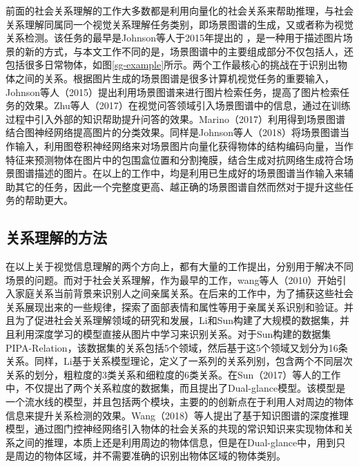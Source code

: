 前面的社会关系理解的工作大多数都是利用向量化的社会关系来帮助推理，与社会关系理解同属同一个视觉关系理解任务类别，即场景图谱的生成，又或者称为视觉关系检测。该任务的最早是Johnson等人于2015年提出的
\cite{johnson2015image}，是一种用于描述图片场景的新的方式，与本文工作不同的是，场景图谱中的主要组成部分不仅包括人，还包括很多日常物体，如图\ref{sg-example}所示。两个工作最核心的挑战在于识别出物体之间的关系。根据图片生成的场景图谱是很多计算机视觉任务的重要输入，Johnson等人（2015）\cite{johnson2015image}提出利用场景图谱来进行图片检索任务，提高了图片检索任务的效果。Zhu等人（2017）\cite{zhu2017knowledge}在视觉问答领域引入场景图谱中的信息，通过在训练过程中引入外部的知识帮助提升问答的效果。Marino（2017）\cite{marino2017the}利用得到场景图谱结合图神经网络提高图片的分类效果。同样是Johnson等人（2018）\cite{johnson2018image}将场景图谱当作输入，利用图卷积神经网络来对场景图片向量化获得物体的结构编码向量，当作特征来预测物体在图片中的包围盒位置和分割掩膜，结合生成对抗网络生成符合场景图谱描述的图片。在以上的工作中，均是利用已生成好的场景图谱当作输入来辅助其它的任务，因此一个完整度更高、越正确的场景图谱自然而然对于提升这些任务的帮助更大。

\subsection{关系理解的方法}
在以上关于视觉信息理解的两个方向上，都有大量的工作提出，分别用于解决不同场景的问题。而对于社会关系理解，作为最早的工作，wang等人（2010）开始引入家庭关系当前背景来识别人之间亲属关系。在后来的工作中\cite{dibeklioglu2013like,xia2012understanding,chen2012discovering}，为了捕获这些社会关系展现出来的一些规律，探索了面部表情和属性等用于亲属关系识别和验证。并且为了促进社会关系理解领域的研究和发展，Li\cite{li2017dual-glance}和Sun\cite{sun2017a}构建了大规模的数据集，并且利用深度学习的模型直接从图片中学习来识别关系。对于Sun构建的数据集PIPA-Relation，该数据集的关系包括5个领域，然后基于这5个领域又划分为16条关系。同样，Li基于关系模型理论，定义了一系列的关系列别，包含两个不同层次关系的划分，粗粒度的3类关系和细粒度的6类关系。在Sun（2017）等人的工作中，不仅提出了两个关系粒度的数据集，而且提出了Dual-glance模型。该模型是一个流水线的模型，并且包括两个模块，主要的的创新点在于利用人对周边的物体信息来提升关系检测的效果。Wang（2018）等人提出了基于知识图谱的深度推理模型，通过图门控神经网络引入物体的社会关系的共现的常识知识来实现物体和关系之间的推理，本质上还是利用周边的物体信息，但是在Dual-glance中，用到只是周边的物体区域，并不需要准确的识别出物体区域的物体类别。

